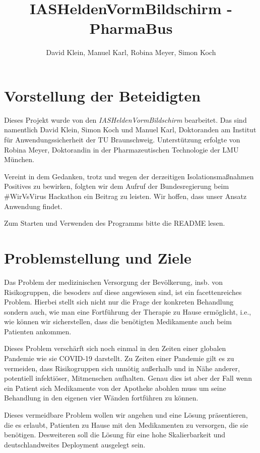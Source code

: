 \documentclass[a4]{article}
\title{IASHeldenVormBildschirm - PharmaBus}
\author{David Klein, Manuel Karl, Robina Meyer, Simon Koch}
\begin{document}
\maketitle


\section{Vorstellung der Beteidigten}
Dieses Projekt wurde von den \textit{IASHeldenVormBildschirm} bearbeitet. Das sind namentlich David Klein, Simon Koch und Manuel Karl, Doktoranden am Institut für Anwendungssicherheit der TU Braunschweig. Unterstützung erfolgte von Robina Meyer, Doktorandin in der Pharmazeutischen Technologie der LMU München.

Vereint in dem Gedanken, trotz und wegen der derzeitigen Isolationsmaßnahmen Positives zu bewirken, folgten wir dem Aufruf der Bundesregierung beim \#WirVsVirus Hackathon ein Beitrag zu leisten. Wir hoffen, dass unser Ansatz Anwendung findet.

Zum Starten und Verwenden des Programms bitte die README lesen.


\section{Problemstellung und Ziele}

Das Problem der medizinischen Versorgung der Bevölkerung, insb. von Risikogruppen, die besoders auf diese angewiesen sind, ist ein facettenreiches Problem.
Hierbei stellt sich nicht nur die Frage der konkreten Behandlung sondern auch, wie man eine Fortführung der Therapie zu Hause ermöglicht, i.e., wie können wir sicherstellen, dass die benötigten Medikamente auch beim Patienten ankommen.

Dieses Problem verschärft sich noch einmal in den Zeiten einer globalen Pandemie wie sie COVID-19 darstellt. Zu Zeiten einer Pandemie gilt es zu vermeiden, dass Risikogruppen sich unnötig außerhalb und in Nähe anderer, potentiell infektiöser, Mitmenschen aufhalten. Genau dies ist aber der Fall wenn ein Patient sich Medikamente von der Apotheke abohlen muss um seine Behandlung in den eigenen vier Wänden fortführen zu können.

Dieses vermeidbare Problem wollen wir angehen und eine Lösung präsentieren, die es erlaubt, Patienten zu Hause mit den Medikamenten zu versorgen, die sie benötigen. Desweiteren soll die Lösung für eine hohe Skalierbarkeit und deutschlandweites Deployment ausgelegt sein.
\end{document}
